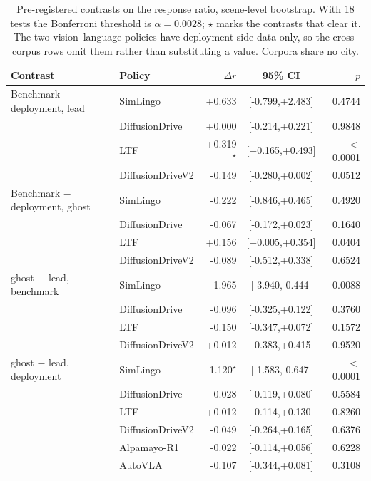 \begin{table}[!tb]
\centering
\setlength{\tabcolsep}{4pt}
\footnotesize
\caption{Pre-registered contrasts on the response ratio, scene-level bootstrap. With 18 tests the Bonferroni threshold is $\alpha=0.0028$; $\star$ marks the contrasts that clear it. The two vision--language policies have deployment-side data only, so the cross-corpus rows omit them rather than substituting a value. Corpora share no city.}
\label{tab:contrasts}
\begin{tabular}{llrcr}
\toprule
Contrast & Policy & $\Delta r$ & 95\% CI & $p$\\
\midrule
Benchmark $-$ deployment, lead & SimLingo & +0.633 & [-0.799,+2.483] & 0.4744\\
 & DiffusionDrive & +0.000 & [-0.214,+0.221] & 0.9848\\
 & LTF & +0.319$^\star$ & [+0.165,+0.493] & $<$0.0001\\
 & DiffusionDriveV2 & -0.149 & [-0.280,+0.002] & 0.0512\\
\midrule
Benchmark $-$ deployment, ghost & SimLingo & -0.222 & [-0.846,+0.465] & 0.4920\\
 & DiffusionDrive & -0.067 & [-0.172,+0.023] & 0.1640\\
 & LTF & +0.156 & [+0.005,+0.354] & 0.0404\\
 & DiffusionDriveV2 & -0.089 & [-0.512,+0.338] & 0.6524\\
\midrule
ghost $-$ lead, benchmark & SimLingo & -1.965 & [-3.940,-0.444] & 0.0088\\
 & DiffusionDrive & -0.096 & [-0.325,+0.122] & 0.3760\\
 & LTF & -0.150 & [-0.347,+0.072] & 0.1572\\
 & DiffusionDriveV2 & +0.012 & [-0.383,+0.415] & 0.9520\\
\midrule
ghost $-$ lead, deployment & SimLingo & -1.120$^\star$ & [-1.583,-0.647] & $<$0.0001\\
 & DiffusionDrive & -0.028 & [-0.119,+0.080] & 0.5584\\
 & LTF & +0.012 & [-0.114,+0.130] & 0.8260\\
 & DiffusionDriveV2 & -0.049 & [-0.264,+0.165] & 0.6376\\
 & Alpamayo-R1 & -0.022 & [-0.114,+0.056] & 0.6228\\
 & AutoVLA & -0.107 & [-0.344,+0.081] & 0.3108\\
\bottomrule
\end{tabular}
\end{table}
